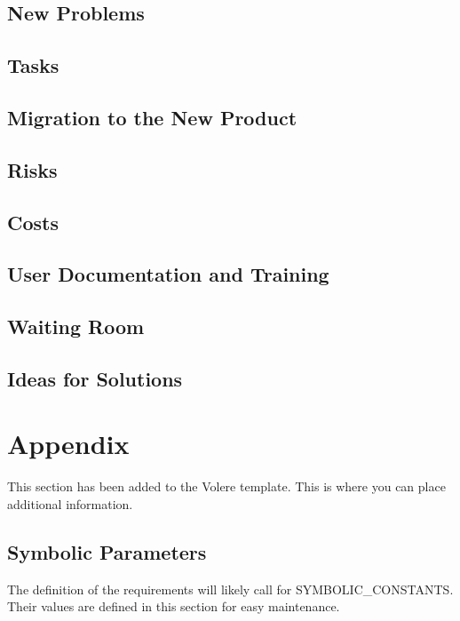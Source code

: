 \documentclass[12pt, titlepage]{article}
\begin{document}
\subsection{New Problems}

\subsection{Tasks}

\subsection{Migration to the New Product}

\subsection{Risks}

\subsection{Costs}

\subsection{User Documentation and Training}

\subsection{Waiting Room}

\subsection{Ideas for Solutions}





\newpage

\section{Appendix}

This section has been added to the Volere template.  This is where you can place
additional information.

\subsection{Symbolic Parameters}

The definition of the requirements will likely call for SYMBOLIC\_CONSTANTS.
Their values are defined in this section for easy maintenance.
\end{document}
